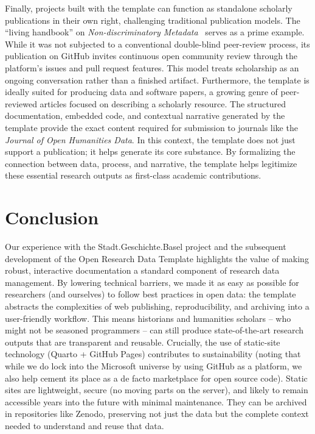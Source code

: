 \documentclass[final]{anthology-ch} %
\begin{document}
Finally, projects built with the template can function as standalone scholarly publications in their own right, challenging traditional publication models. The ``living handbook'' on \emph{Non-discriminatory Metadata}~\cite{maehr2024d} serves as a prime example. While it was not subjected to a conventional double-blind peer-review process, its publication on GitHub invites continuous open community review through the platform's issues and pull request features. This model treats scholarship as an ongoing conversation rather than a finished artifact. Furthermore, the template is ideally suited for producing data and software papers, a growing genre of peer-reviewed articles focused on describing a scholarly resource. The structured documentation, embedded code, and contextual narrative generated by the template provide the exact content required for submission to journals like the \emph{Journal of Open Humanities Data}. In this context, the template does not just support a publication; it helps generate its core substance. By formalizing the connection between data, process, and narrative, the template helps legitimize these essential research outputs as first-class academic contributions.

\section{Conclusion}\label{conclusion}

Our experience with the Stadt.Geschichte.Basel project and the subsequent development of the Open Research Data Template highlights the value of making robust, interactive documentation a standard component of research data management. By lowering technical barriers, we made it as easy as possible for researchers (and ourselves) to follow best practices in open data: the template abstracts the complexities of web publishing, reproducibility, and archiving into a user-friendly workflow. This means historians and humanities scholars -- who might not be seasoned programmers -- can still produce state-of-the-art research outputs that are transparent and reusable. Crucially, the use of static-site technology (Quarto + GitHub Pages) contributes to sustainability (noting that while we do lock into the Microsoft universe by using GitHub as a platform, we also help cement its place as a de facto marketplace for open source code). Static sites are lightweight, secure (no moving parts on the server), and likely to remain accessible years into the future with minimal maintenance. They can be archived in repositories like Zenodo, preserving not just the data but the complete context needed to understand and reuse that data.
\end{document}
